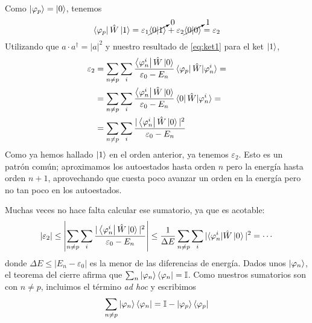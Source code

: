 Como $\ket{\varphi_p} = \ket{0}$, tenemos
\begin{equation}
    \bra{\varphi_p}\hat{W}\ket{1} = \varepsilon_1 \cancelto{0}{\braket{0}{1}} +
    \varepsilon_2 \cancelto{1}{\braket{0}{0}}= \varepsilon_2
\end{equation}
Utilizando que $a \cdot a^\dagger = |a|^2$ y nuestro resultado de
\eqref{eq:ket1} para el ket $\ket{1}$,
\begin{equation}
  \begin{split}
    \varepsilon_2 &= \sum_{n\neq p} \sum_{i}
    \frac{\bra{\varphi_n^i}\hat{W}\ket{0}}{\varepsilon_0 - E_n}
    \bra{\varphi_p}\hat{W}|\varphi_n^i\rangle = \\ &= \sum_{n\neq p} \sum_{i}
    \frac{\bra{\varphi_n^i}\hat{W}\ket{0}}{\varepsilon_0 - E_n}
    \bra{0}\hat{W}|\varphi_n^i\rangle= \\ &= \sum_{n\neq p} \sum_{i}
    \frac{|\bra{\varphi_n^i}\hat{W}\ket{0}|^2}{\varepsilon_0 - E_n}
  \end{split}
\end{equation}
Como ya hemos hallado $\ket{1}$ en el orden anterior, ya tenemos
$\varepsilon_2$. Esto es un patrón común; aproximamos los autoestados
hasta orden $n$ pero la energía hasta orden $n+1$, aprovechando que
cuesta poco avanzar un orden en la energía pero no tan poco en los autoestados.

Muchas veces no hace falta calcular ese sumatorio, ya que es acotable:
\begin{equation}
  |\varepsilon_2| \leq \left|  \sum_{n\neq p} \sum_{i}
    \frac{|\bra{\varphi_n^i}\hat{W}\ket{0}|^2}{\varepsilon_0 - E_n} \right|
  \leq \frac{1}{\Delta E} \sum_{n\neq p} \sum_{i}
    |\langle\varphi_n^i|\hat{W}\ket{0^{}}|^2 = \cdots
\end{equation}
donde $\Delta E \leq |E_n - \varepsilon_0|$ es la menor de las
diferencias de energía.
  Dados unos $\ket{\varphi_n}$, el teorema del cierre afirma que $\sum_n
  \ket{\varphi_n}\bra{\varphi_n} = \mathbb{I}$. Como nuestros sumatorios son
  con $n \neq p$, incluimos el término \emph{ad hoc} y escribimos
  \begin{equation}
    \sum_{n \neq p} \ket{\varphi_n} \bra{\varphi_n} = \mathbb{I} - \ket{\varphi_p}\bra{\varphi_p}
  \end{equation}


